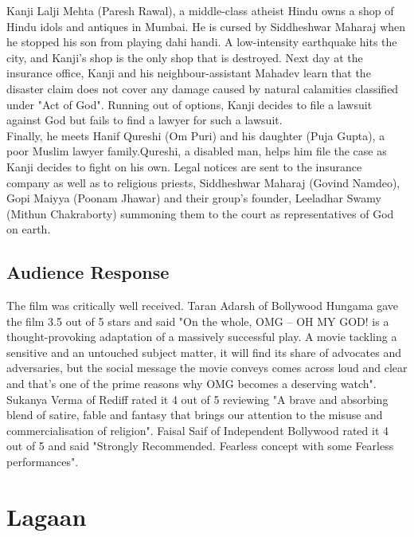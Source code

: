 \documentclass[a4paper]{article}
\begin{document}
Kanji Lalji Mehta (Paresh Rawal), a middle-class atheist Hindu owns a shop of Hindu idols and antiques in Mumbai. He is cursed by Siddheshwar Maharaj when he stopped his son from playing dahi handi. A low-intensity earthquake hits the city, and Kanji's shop is the only shop that is destroyed. Next day at the insurance office, Kanji and his neighbour-assistant Mahadev learn that the disaster claim does not cover any damage caused by natural calamities classified under "Act of God".   Running out of options, Kanji decides to file a lawsuit against God but fails to find a lawyer for such a lawsuit.\\
	Finally, he meets Hanif Qureshi (Om Puri) and his daughter (Puja Gupta), a poor Muslim lawyer family.Qureshi, a disabled man, helps him file the case as Kanji decides to fight on his own. Legal notices are sent to the insurance company as well as to religious priests, Siddheshwar Maharaj (Govind Namdeo), Gopi Maiyya (Poonam Jhawar) and their group's founder, Leeladhar Swamy (Mithun Chakraborty) summoning them to the court as representatives of God on earth.	        
	                  



\subsection{Audience Response}
	   
	The film was critically well received.
Taran Adarsh of Bollywood Hungama gave the film 3.5 out of 5 stars and said "On the whole, OMG – OH MY GOD! is a thought-provoking adaptation of a massively successful play. A movie tackling a sensitive and an untouched subject matter, it will find its share of advocates and adversaries, but the social message the movie conveys comes across loud and clear and that's one of the prime reasons why OMG becomes a deserving watch". Sukanya Verma of Rediff rated it 4 out of 5 reviewing "A brave and absorbing blend of satire, fable and fantasy that brings our attention to the misuse and commercialisation of religion". Faisal Saif of Independent Bollywood rated it 4 out of 5 and said "Strongly Recommended. Fearless concept with some Fearless performances".   	        
	        
	  	
	
	
	  \section{Lagaan }
	  
	  
	 
\end{document}

